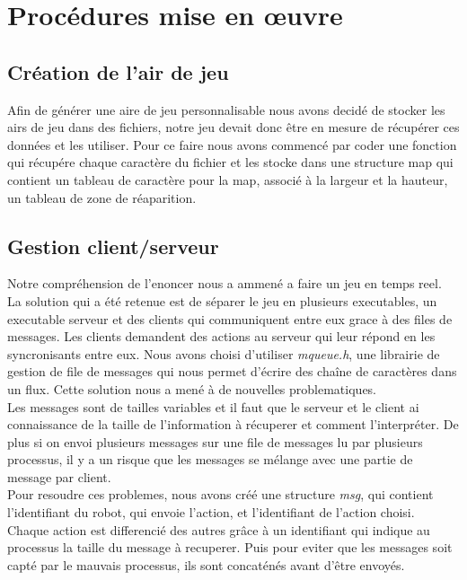 \documentclass[a4paper, 11pt]{article}
\title{\myfont {Robots programmables}}
\author{\huge {COTREZ Léo}\and \huge {ORNIACKI Thomas}\and \\Université Paris-VIII, Saint-Denis, France\and \\Licence 2 Informatique}
\date{Premier Semestre 2018}
\begin{document}
\maketitle

\newpage
\tableofcontents

\newpage
\section{Procédures mise en \oe uvre}
\subsection{Création de l'air de jeu}
Afin de générer une aire de jeu personnalisable nous avons decidé de stocker les airs de jeu dans des fichiers, notre jeu devait donc être en mesure de récupérer ces données et les utiliser. Pour ce faire nous avons commencé par coder une fonction qui récupére chaque caractère du fichier et les stocke dans une structure map qui contient un tableau de caractère pour la map, associé à la largeur et la hauteur, un tableau de zone de réaparition.\\
\subsection{Gestion client/serveur}
Notre compréhension de l'enoncer nous a ammené a faire un jeu en temps reel. La solution qui a été retenue est de séparer le jeu en plusieurs executables, un executable serveur et des clients qui communiquent entre eux grace à des files de messages. Les clients demandent des actions au serveur qui leur répond en les syncronisants entre eux. Nous avons choisi d'utiliser \emph{mqueue.h}, une librairie de gestion de file de messages qui nous permet d'écrire des chaîne de caractères dans un flux. Cette solution nous a mené à de nouvelles problematiques.\\
Les messages sont de tailles variables et il faut que le serveur et le client ai connaissance de la taille de l'information à récuperer et comment l'interpréter. De plus si on envoi plusieurs messages sur une file de messages lu par plusieurs processus, il y a un risque que les messages se mélange avec une partie de message par client.\\
Pour resoudre ces problemes, nous avons créé une structure \emph{msg}, qui contient l'identifiant du robot, qui envoie l'action, et l'identifiant de l'action choisi. Chaque action est differencié des autres grâce à un identifiant qui indique au processus la taille du message à recuperer. Puis pour eviter que les messages soit capté par le mauvais processus, ils sont concaténés avant d'être envoyés.\\
\end{document}
